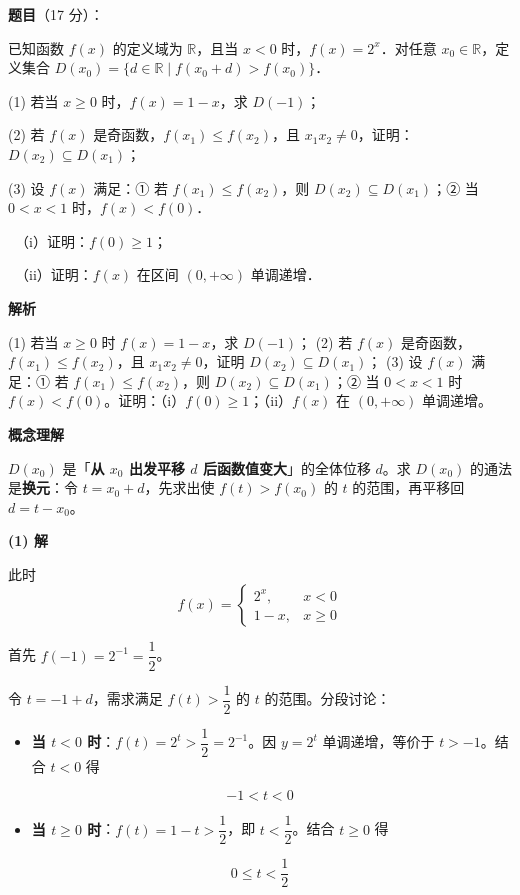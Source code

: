 \begin{answer}

\textbf{题目}（17 分）：

已知函数 $f(x)$ 的定义域为 $\mathbb{R}$，且当 $x<0$ 时，$f(x)=2^{x}$．对任意 $x_0\in\mathbb{R}$，定义集合 $D(x_0)=\{d\in\mathbb{R}\mid f(x_0+d)>f(x_0)\}$．

  (1) 若当 $x\ge 0$ 时，$f(x)=1-x$，求 $D(-1)$；

  (2) 若 $f(x)$ 是奇函数，$f(x_1)\le f(x_2)$，且 $x_1x_2\ne 0$，证明：$D(x_2)\subseteq D(x_1)$；

  (3) 设 $f(x)$ 满足：① 若 $f(x_1)\le f(x_2)$，则 $D(x_2)\subseteq D(x_1)$；② 当 $0<x<1$ 时，$f(x)<f(0)$．

  　（i）证明：$f(0)\ge 1$；

  　（ii）证明：$f(x)$ 在区间 $(0,+\infty)$ 单调递增．

\par\medskip

\textbf{解析}

  (1) 若当 $x\ge0$ 时 $f(x)=1-x$，求 $D(-1)$；
  (2) 若 $f(x)$ 是奇函数，$f(x_1)\le f(x_2)$，且 $x_1x_2\ne0$，证明 $D(x_2)\subseteq D(x_1)$；
  (3) 设 $f(x)$ 满足：① 若 $f(x_1)\le f(x_2)$，则 $D(x_2)\subseteq D(x_1)$；② 当 $0<x<1$ 时 $f(x)<f(0)$。证明：（i）$f(0)\ge1$；（ii）$f(x)$ 在 $(0,+\infty)$ 单调递增。

\par\medskip

\textbf{概念理解}

$D(x_0)$ 是「\textbf{从 $x_0$ 出发平移 $d$ 后函数值变大}」的全体位移 $d$。求 $D(x_0)$ 的通法是\textbf{换元}：令 $t=x_0+d$，先求出使 $f(t)>f(x_0)$ 的 $t$ 的范围，再平移回 $d=t-x_0$。

\par\medskip

\textbf{(1) 解}

此时
\nopagebreak[4]
\[f(x)=\begin{cases}2^{x},&x<0\\ 1-x,&x\ge0\end{cases}\]

首先 $f(-1)=2^{-1}=\dfrac12$。

令 $t=-1+d$，需求满足 $f(t)>\dfrac12$ 的 $t$ 的范围。分段讨论：

\begin{itemize}
\item \textbf{当 $t<0$ 时}：$f(t)=2^{t}>\dfrac12=2^{-1}$。因 $y=2^t$ 单调递增，等价于 $t>-1$。结合 $t<0$ 得
\end{itemize}
\nopagebreak[4]
\[-1<t<0\]
\begin{itemize}
\item \textbf{当 $t\ge0$ 时}：$f(t)=1-t>\dfrac12$，即 $t<\dfrac12$。结合 $t\ge0$ 得
\end{itemize}
\nopagebreak[4]
\[0\le t<\frac12\]


\end{answer}
